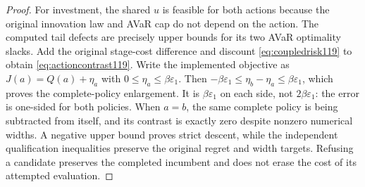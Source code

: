\begin{proof}
For investment, the shared $u$ is feasible for both actions because
the original innovation law and AVaR cap do not depend on the action.
The computed tail defects are precisely upper bounds for its two
AVaR optimality slacks.  Add the original stage-cost difference and
discount \eqref{eq:coupledrisk119} to obtain
\eqref{eq:actioncontrast119}.  Write the implemented objective as
$J(a)=Q(a)+\eta_a$ with $0\le\eta_a\le\beta\varepsilon_1$.
Then $-\beta\varepsilon_1\le\eta_b-\eta_a
\le\beta\varepsilon_1$, which proves the complete-policy
enlargement.  It is $\beta\varepsilon_1$ on each side, not
$2\beta\varepsilon_1$: the error is one-sided for both policies.
When $a=b$, the same complete policy is being subtracted from itself,
and its contrast is exactly zero despite nonzero numerical widths.
A negative upper bound proves strict descent, while the independent
qualification inequalities preserve the original regret and width
targets.  Refusing a candidate preserves the completed incumbent and
does not erase the cost of its attempted evaluation.
\end{proof}

